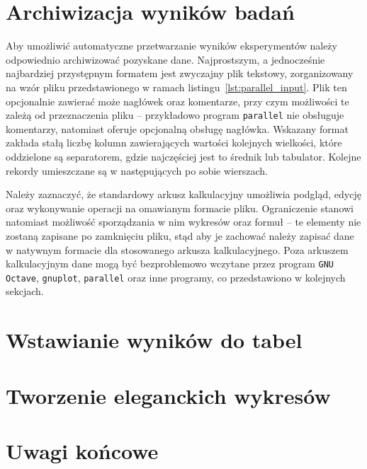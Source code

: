 \section{Archiwizacja wyników badań}

Aby umożliwić automatyczne przetwarzanie wyników eksperymentów należy odpowiednio archiwizować pozyskane dane. Najprostszym, a jednocześnie najbardziej przystępnym formatem jest zwyczajny plik tekstowy, zorganizowany na wzór pliku przedstawionego w ramach listingu~\ref{lst:parallel_input}. Plik ten opcjonalnie zawierać może nagłówek oraz komentarze, przy czym możliwości te zależą od przeznaczenia pliku -- przykładowo program \texttt{parallel} nie obsługuje komentarzy, natomiast oferuje opcjonalną obsługę nagłówka. Wskazany format zakłada stałą liczbę kolumn zawierających wartości kolejnych wielkości, które oddzielone są separatorem, gdzie najczęściej jest to średnik lub tabulator. Kolejne rekordy umieszczane są w następujących po sobie wierszach.

Należy zaznaczyć, że standardowy arkusz kalkulacyjny umożliwia podgląd, edycję oraz wykonywanie operacji na omawianym formacie pliku. Ograniczenie stanowi natomiast możliwość sporządzania w nim wykresów oraz formuł -- te elementy nie zostaną zapisane po zamknięciu pliku, stąd aby je zachować należy zapisać dane w natywnym formacie dla stosowanego arkusza kalkulacyjnego. Poza arkuszem kalkulacyjnym dane mogą być bezproblemowo wczytane przez program \texttt{GNU Octave}, \texttt{gnuplot}, \texttt{parallel} oraz inne programy, co przedstawiono w kolejnych sekcjach.



\section{Wstawianie wyników do tabel}

\section{Tworzenie eleganckich wykresów}

\section{Uwagi końcowe}
